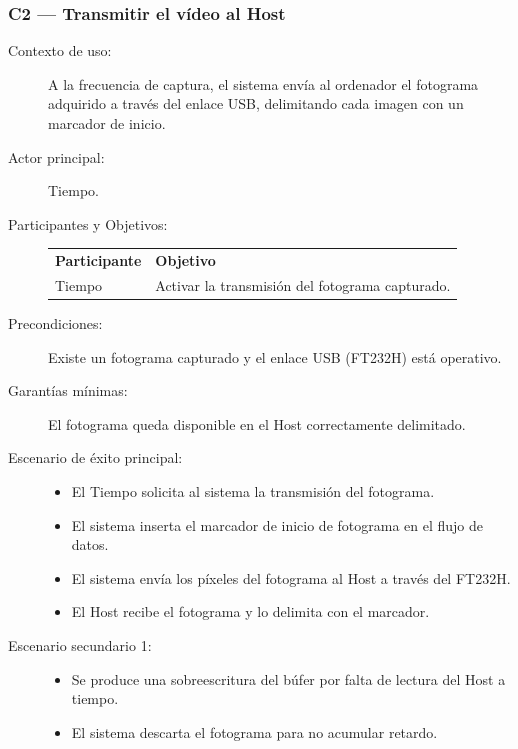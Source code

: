 \documentclass[../main.tex]{subfiles}
\begin{document}
\subsubsection{C2 --- Transmitir el vídeo al Host}
\begin{description}
    \item[Contexto de uso:] A la frecuencia de captura, el sistema envía al ordenador el fotograma adquirido a través del enlace USB, delimitando cada imagen con un marcador de inicio.
    \item[Actor principal:] Tiempo.
    \item[Participantes y Objetivos:] \hfill
        
    \begin{tabular}{>{\raggedright\arraybackslash}p{3cm}>{\raggedright\arraybackslash}p{10cm}}
    \rowcolor[HTML]{156082}
    {\color{white}\textbf{Participante}} & {\color{white}\textbf{Objetivo}} \\
    \rowcolor[HTML]{C0E6F5}
    Tiempo & Activar la transmisión del fotograma capturado. \\
    \end{tabular}

    \item[Precondiciones:] Existe un fotograma capturado y el enlace USB (FT232H) está operativo.
    \item[Garantías mínimas:] El fotograma queda disponible en el Host correctamente delimitado.
    \item[Escenario de éxito principal:] \hfill
    \begin{itemize}
        \item El Tiempo solicita al sistema la transmisión del fotograma.
        \item El sistema inserta el marcador de inicio de fotograma en el flujo de datos.
        \item El sistema envía los píxeles del fotograma al Host a través del FT232H.
        \item El Host recibe el fotograma y lo delimita con el marcador.
    \end{itemize}
    \item[Escenario secundario 1:] \hfill
    \begin{itemize}
        \item Se produce una sobreescritura del búfer por falta de lectura del Host a tiempo.
        \item El sistema descarta el fotograma para no acumular retardo.
    \end{itemize}
\end{description}
\end{document}
